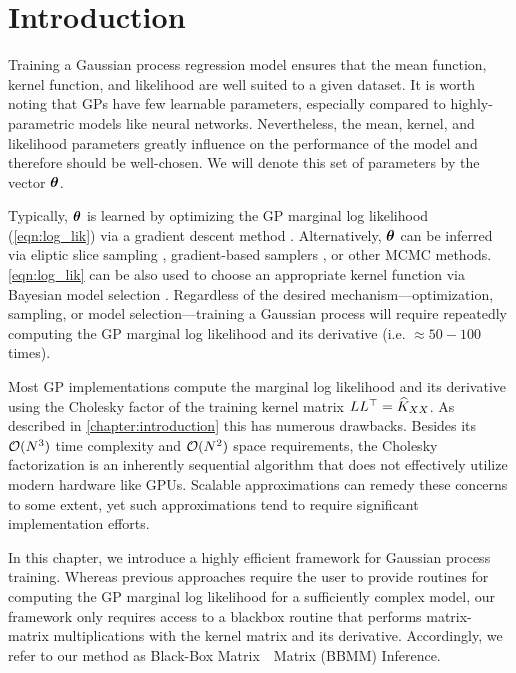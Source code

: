 \section{Introduction}

Training a Gaussian process regression model ensures that the mean function, kernel function, and likelihood are well suited to a given dataset.
It is worth noting that GPs have few learnable parameters, especially compared to highly-parametric models like neural networks.
Nevertheless, the mean, kernel, and likelihood parameters greatly influence on the performance of the model and therefore should be well-chosen.
We will denote this set of parameters by the vector $\boldsymbol{\theta}$.

Typically, $\boldsymbol{\theta}$ is learned by optimizing the GP marginal log likelihood (\cref{eqn:log_lik}) via a gradient descent method \cite{rasmussen2006gaussian}.
Alternatively, $\boldsymbol{\theta}$ can be inferred via eliptic slice sampling \cite{murray2010elliptical}, gradient-based samplers \cite{havasi2018inference}, or other MCMC methods.
\cref{eqn:log_lik} can be also used to choose an appropriate kernel function via Bayesian model selection \cite{rasmussen2006gaussian,duvenaud2013structure}.
Regardless of the desired mechanism---optimization, sampling, or model selection---training a Gaussian process will require repeatedly computing the GP marginal log likelihood and its derivative (i.e. $\approx50-100$ times).

Most GP implementations compute the marginal log likelihood and its derivative using the Cholesky factor of the training kernel matrix $L L^\top = \widehat{K}_{XX}$.
As described in \cref{chapter:introduction} this has numerous drawbacks.
Besides its $\bigo{N^3}$ time complexity and $\bigo{N^2}$ space requirements, the Cholesky factorization is an inherently sequential algorithm that does not effectively utilize modern hardware like GPUs.
Scalable approximations can remedy these concerns to some extent, yet such approximations tend to require significant implementation efforts.

In this chapter, we introduce a highly efficient framework for Gaussian process training.
Whereas previous approaches require the user to provide routines for computing the GP marginal log likelihood for a sufficiently complex model,
our framework only requires access to a blackbox routine that performs matrix-matrix multiplications with the kernel matrix and its derivative.
Accordingly, we refer to our method as Black-Box Matrix~\texttimes~Matrix (BBMM) Inference.

